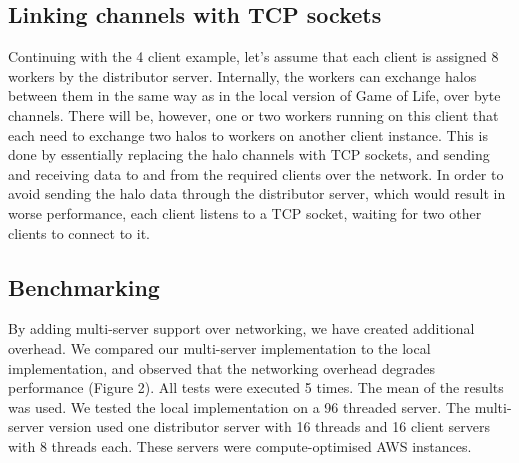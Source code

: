 \documentclass[a4, 11pt]{article}
\begin{document}
\begin{multicols}{2}
\subsection{Linking channels with TCP sockets}
Continuing with the 4 client example, let's assume that each client is assigned 8 workers by the distributor server. Internally, the workers can exchange halos between them in the same way as in the local version of Game of Life, over byte channels. There will be, however, one or two workers running on this client that each need to exchange two halos to workers on another client instance. This is done by essentially replacing the halo channels with TCP sockets, and sending and receiving data to and from the required clients over the network. In order to avoid sending the halo data through the distributor server, which would result in worse performance, each client listens to a TCP socket, waiting for two other clients to connect to it.

\subsection{Benchmarking}
By adding multi-server support over networking, we have created additional overhead. We compared our multi-server implementation to the local implementation, and observed that the networking overhead degrades performance (Figure 2). All tests were executed 5 times. The mean of the results was used. We tested the local implementation on a 96 threaded server. The multi-server version used one distributor server with 16 threads and 16 client servers with 8 threads each. These servers were compute-optimised AWS instances.

\vspace{0.3cm}
\end{multicols}
\end{document}
